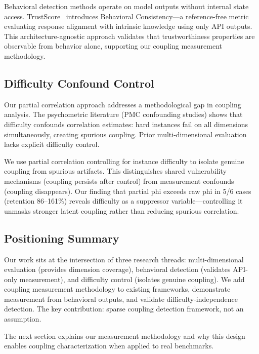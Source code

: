 Behavioral detection methods operate on model outputs without internal state access. TrustScore~\cite{zheng2024trustscore} introduces Behavioral Consistency---a reference-free metric evaluating response alignment with intrinsic knowledge using only API outputs. This architecture-agnostic approach validates that trustworthiness properties are observable from behavior alone, supporting our coupling measurement methodology.

\subsection{Difficulty Confound Control}

Our partial correlation approach addresses a methodological gap in coupling analysis. The psychometric literature (PMC confounding studies) shows that difficulty confounds correlation estimates: hard instances fail on all dimensions simultaneously, creating spurious coupling. Prior multi-dimensional evaluation lacks explicit difficulty control.

We use partial correlation controlling for instance difficulty to isolate genuine coupling from spurious artifacts. This distinguishes shared vulnerability mechanisms (coupling persists after control) from measurement confounds (coupling disappears). Our finding that partial phi exceeds raw phi in 5/6 cases (retention 86--161\%) reveals difficulty as a suppressor variable---controlling it unmasks stronger latent coupling rather than reducing spurious correlation.

\subsection{Positioning Summary}

Our work sits at the intersection of three research threads: multi-dimensional evaluation (provides dimension coverage), behavioral detection (validates API-only measurement), and difficulty control (isolates genuine coupling). We add coupling measurement methodology to existing frameworks, demonstrate measurement from behavioral outputs, and validate difficulty-independence detection. The key contribution: sparse coupling detection framework, not an assumption.

The next section explains our measurement methodology and why this design enables coupling characterization when applied to real benchmarks.
